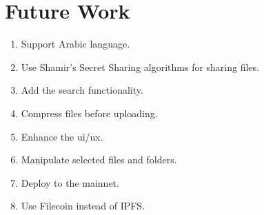 \section{Future Work}

\begin{enumerate}
\item Support Arabic language.
\item Use Shamir's Secret Sharing algorithms for sharing files.
\item Add the search functionality.
\item Compress files before uploading.
\item Enhance the ui/ux.
\item Manipulate selected files and folders.
\item Deploy to the mainnet.
\item Use Filecoin instead of IPFS.
\end{enumerate}